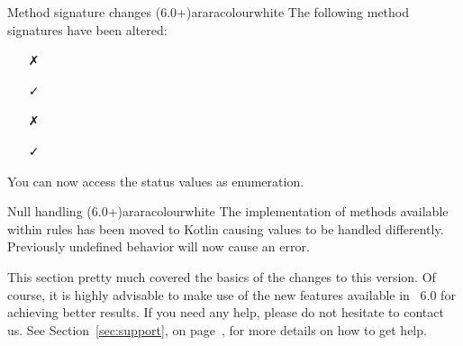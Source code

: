 \begin{messagebox}{Method signature changes (6.0+)}{araracolour}{\icinfo}{white}
The following method signatures have been altered:

\begin{itemize}
\item[\textcolor{warningcolour}{\faClose}]

\vspace{.5em}

\hspace{2cm}\textcolor{teal}{\faArrowDown}

\item[\textcolor{okcolour}{\faCheck}]

\vspace{1em}

\item[\textcolor{warningcolour}{\faClose}]

\vspace{.5em}

\hspace{2cm}\textcolor{teal}{\faArrowDown}

\item[\textcolor{okcolour}{\faCheck}]
\end{itemize}

You can now access the status values as enumeration.
\end{messagebox}

\begin{messagebox}{Null handling (6.0+)}{araracolour}{\icinfo}{white}
The implementation of methods available within rules has been moved to Kotlin causing  values to be handled differently. Previously undefined behavior will now cause an error.
\end{messagebox}

This section pretty much covered the basics of the changes to this version. Of course, it is highly advisable to make use of the new features available in \arara\ 6.0 for achieving better results. If you need any help, please do not hesitate to contact us. See Section~\ref{sec:support}, on page~\pageref{sec:support}, for more details on how to get help.
